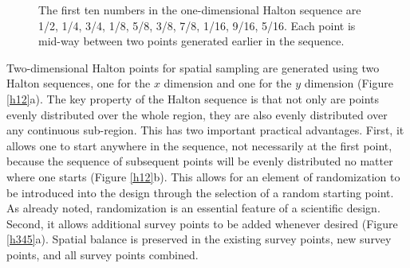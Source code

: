 \documentclass[a4paper,11pt]{article} %
\begin{document}
\begin{figure}[htbp]
\centering
{}
\caption{The first ten numbers in the one-dimensional Halton sequence are 1/2, 1/4, 3/4, 1/8, 5/8, 3/8, 7/8, 1/16, 9/16, 5/16. Each point is mid-way between two points generated earlier in the sequence.}
\label{halton}
\end{figure}

Two-dimensional Halton points for spatial sampling are generated using two Halton sequences, one for the $x$ dimension and one for the $y$ dimension (Figure \ref{h12}a). The key property of the Halton sequence is that not only are points evenly distributed over the whole region, they are also evenly distributed over any continuous sub-region. This has two important practical advantages. First, it allows one to start anywhere in the sequence, not necessarily at the first point, because the sequence of subsequent points will be evenly distributed no matter where one starts (Figure \ref{h12}b). This allows for an element of randomization to be introduced into the design through the selection of a random starting point. As already noted, randomization is an essential feature of a scientific design. Second, it allows additional survey points to be added whenever desired (Figure \ref{h345}a). Spatial balance is preserved in the existing survey points, new survey points, and all survey points combined. 
\end{document}
